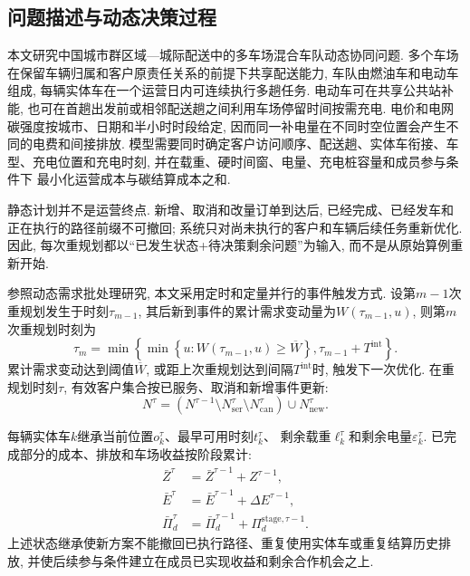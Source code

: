 
\subsection{问题描述与动态决策过程}

本文研究中国城市群区域—城际配送中的多车场混合车队动态协同问题.
多个车场在保留车辆归属和客户原责任关系的前提下共享配送能力,
车队由燃油车和电动车组成, 每辆实体车在一个运营日内可连续执行多趟任务.
电动车可在共享公共站补能,
也可在首趟出发前或相邻配送趟之间利用车场停留时间按需充电.
电价和电网碳强度按城市、日期和半小时时段给定,
因而同一补电量在不同时空位置会产生不同的电费和间接排放.
模型需要同时确定客户访问顺序、配送趟、实体车衔接、车型、充电位置和充电时刻,
并在载重、硬时间窗、电量、充电桩容量和成员参与条件下
最小化运营成本与碳结算成本之和.

静态计划并不是运营终点.
新增、取消和改量订单到达后,
已经完成、已经发车和正在执行的路径前缀不可撤回;
系统只对尚未执行的客户和车辆后续任务重新优化.
因此, 每次重规划都以“已发生状态+待决策剩余问题”为输入,
而不是从原始算例重新开始.

参照动态需求批处理研究\cite{ref:18,ref:71},
本文采用定时和定量并行的事件触发方式.
设第$m-1$次重规划发生于时刻$\tau_{m-1}$,
其后新到事件的累计需求变动量为$W(\tau_{m-1},u)$,
则第$m$次重规划时刻为
\begin{equation}
\tau_m=\min\left\{
\min\left\{u:W(\tau_{m-1},u)\ge\overline W\right\},
\tau_{m-1}+T^{\mathrm{int}}
\right\}.
\label{eq:trigger}
\end{equation}
累计需求变动达到阈值$\overline W$,
或距上次重规划达到间隔$T^{\mathrm{int}}$时, 触发下一次优化.
在重规划时刻$\tau$, 有效客户集合按已服务、取消和新增事件更新:
\begin{equation}
N^\tau=
\left(N^{\tau-1}\setminus N_{\mathrm{ser}}^\tau
\setminus N_{\mathrm{can}}^\tau\right)
\cup N_{\mathrm{new}}^\tau.
\label{eq:customer_update}
\end{equation}

每辆实体车$k$继承当前位置$o_k^\tau$、最早可用时刻$t_k^\tau$、
剩余载重$\ell_k^\tau$和剩余电量$\varepsilon_k^\tau$.
已完成部分的成本、排放和车场收益按阶段累计:
\begin{equation}
\begin{aligned}
\bar Z^\tau
&=\bar Z^{\tau-1}+Z^{\tau-1},\\
\bar E^\tau
&=\bar E^{\tau-1}+\Delta E^{\tau-1},\\
\bar\Pi_d^\tau
&=\bar\Pi_d^{\tau-1}+\Pi_d^{\mathrm{stage},\tau-1}.
\end{aligned}
\label{eq:accumulation}
\end{equation}
上述状态继承使新方案不能撤回已执行路径、重复使用实体车或重复结算历史排放,
并使后续参与条件建立在成员已实现收益和剩余合作机会之上.

